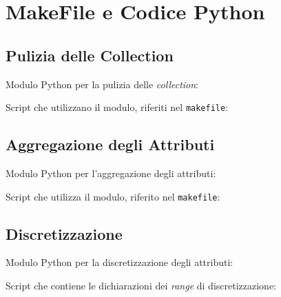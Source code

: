 \begin{appendices}
\label{appendix}
\chapter{MakeFile e Codice Python}

    \section{Pulizia delle Collection}
    \label{appendix:cleanings}

        Modulo Python per la pulizia delle \textit{collection}:
        

        \vspace{0.6 cm}

        Script che utilizzano il modulo, riferiti nel \texttt{makefile}:
        
        

    \section{Aggregazione degli Attributi}
    \label{appendix:aggregs}

        Modulo Python per l'aggregazione degli attributi:
        

        \vspace{0.6 cm}

        Script che utilizza il modulo, riferito nel \texttt{makefile}:
        
        

    \section{Discretizzazione}
    \label{appendix:discretize}

        Modulo Python per la discretizzazione degli attributi:
        

        \vspace{0.6 cm}

        Script che contiene le dichiarazioni dei \textit{range} di discretizzazione:
        


\end{appendices}
